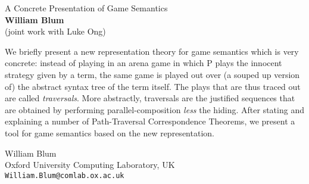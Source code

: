\documentclass[a4paper,12pt]{article}
\begin{document}

\begin{center}
{\large A Concrete Presentation of Game Semantics}\\[3mm]
\textbf{William Blum}\\[3mm]
(joint work with Luke Ong)\\[3mm]
\end{center}
\bigskip

\noindent  We briefly present a new representation theory for game semantics which is very concrete: instead of playing in an arena game in which P plays the innocent strategy given by a term, the same game is played out over (a souped up version of) the abstract syntax tree of the term itself. The plays that are thus traced out are called \emph{traversals}. More abstractly, traversals are the justified sequences that are obtained by performing parallel-composition \emph{less} the hiding. After stating and explaining a number of Path-Traversal Correspondence Theorems, we present a tool for game semantics based on the new representation.


\vspace{5mm}\vfill\noindent
William Blum\\[.5ex]
Oxford University Computing Laboratory, UK\\
\texttt{William.Blum@comlab.ox.ac.uk}\\[2ex]
\end{document}
